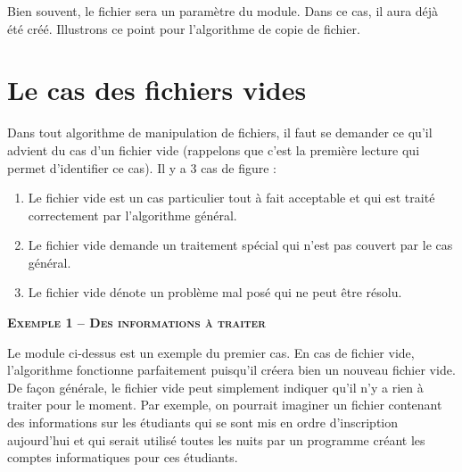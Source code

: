 Bien souvent, le fichier sera un paramètre du module. Dans ce cas, il
aura déjà été créé. Illustrons ce point pour
l'algorithme de copie de fichier.




\section{Le cas des fichiers vides}

Dans tout algorithme de manipulation de fichiers, il faut se demander ce
qu'il advient du cas d'un fichier
vide (rappelons que c'est la première lecture qui
permet d'identifier ce cas). Il y a 3 cas de figure :

\begin{enumerate}
	\item 
		Le fichier vide est un cas particulier tout à fait acceptable et qui est
		traité correctement par l'algorithme général.
	\item 
		Le fichier vide demande un traitement spécial qui n'est
		pas couvert par le cas général.
	\item 
		Le fichier vide dénote un problème mal posé qui ne peut être résolu.
\end{enumerate}

{\sffamily\bfseries\scshape
Exemple 1 – Des informations à traiter}

Le module  ci-dessus est un exemple du
premier cas. En cas de fichier vide, l'algorithme
fonctionne parfaitement puisqu'il créera bien un
nouveau fichier vide. De façon générale, le fichier vide peut
simplement indiquer qu'il n'y a rien
à traiter pour le moment. Par exemple, on pourrait imaginer un fichier
contenant des informations sur les étudiants qui se sont mis en ordre
d'inscription aujourd'hui et qui
serait utilisé toutes les nuits par un programme créant les comptes
informatiques pour ces étudiants. 

